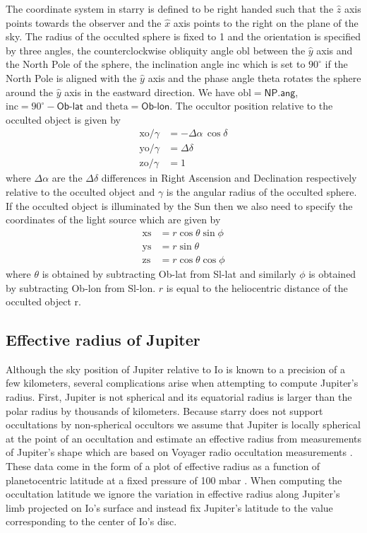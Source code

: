 \documentclass[modern]{aastex62}
\begin{document}
The coordinate system in \textsf{starry} is defined to be right handed such that the $\hat{z}$
axis points towards the observer and the $\hat{x}$ axis points to the right on the plane of the sky.
The radius of the occulted sphere is fixed to 1 and the orientation is specified by three angles,
the counterclockwise obliquity angle \textsf{obl} between the $\hat{y}$ axis and the North Pole of the sphere, the inclination angle \textsf{inc} which is set to $90^\circ$ if the North Pole is aligned with the $\hat{y}$ axis and the phase angle \textsf{theta} rotates the sphere around the $\hat{y}$ axis in the eastward direction.
We have $\mathrm{obl}=\textsf{NP.ang}$, $\mathrm{inc}=90^\circ-\textsf{Ob-lat}$ and
$\mathrm{theta}=\textsf{Ob-lon}$.
The occultor position relative to the occulted object is given by
\begin{align}
    \mathrm{xo}/\gamma&=-\Delta\alpha\,\cos\delta\\
    \mathrm{yo}/\gamma&=\Delta\delta\\
    \mathrm{zo}/\gamma&=1
\end{align}
where $\Delta\alpha$ are the $\Delta\delta$ differences in Right Ascension and Declination respectively relative to the occulted object and $\gamma$ is the angular radius of the occulted sphere.
If the occulted object is illuminated by the Sun then we also need to specify the coordinates of the light source which are given by
\begin{align}
    \mathrm{xs}&=r\cos\theta\sin\phi\\
    \mathrm{ys}&=r\sin\theta\\
    \mathrm{zs}&=r\cos\theta\cos\phi
\end{align}
where $\theta$ is obtained by subtracting \textsf{Ob-lat} from \textsf{Sl-lat} and similarly $\phi$ is obtained by subtracting \textsf{Ob-lon} from \textsf{Sl-lon}.
$r$ is equal to the heliocentric distance of the occulted object \textsf{r}.

\subsection{Effective radius of Jupiter}
Although the sky position of Jupiter relative to Io is known to a precision of a few kilometers, several complications arise when attempting to compute Jupiter's radius.
First, Jupiter is not spherical and its equatorial radius is larger than the polar radius by thousands of kilometers. 
Because \textsf{starry} does not support occultations by non-spherical occultors we 
assume that Jupiter is locally spherical at the point of an occultation and estimate an effective radius from measurements of Jupiter's shape which are based on Voyager radio occultation measurements \citep{lindal1981}.
These data come in the form of a plot of effective radius  as a function of planetocentric latitude at a fixed pressure of 100 mbar \citep[Fig.~7 in ][]{lindal1981}.
When computing the occultation latitude we ignore the variation in effective radius along Jupiter's limb projected on Io's surface and instead fix Jupiter's latitude to the value corresponding to the center of Io's disc.
\end{document}
